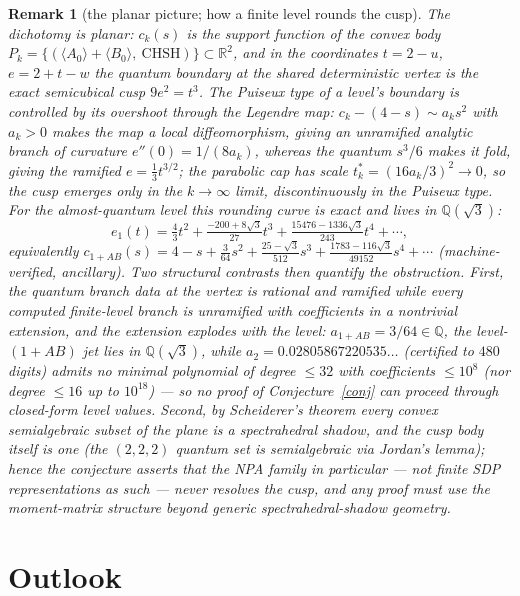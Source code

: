 \documentclass[11pt]{article}
\newtheorem{remark}[theorem]{Remark}
\begin{document}
\begin{remark}[the planar picture; how a finite level rounds the cusp]
The dichotomy is planar: $c_k(s)$ is the support function of the convex body
$P_k=\{(\langle A_0\rangle{+}\langle B_0\rangle,\ \mathrm{CHSH})\}\subset\mathbb R^2$,
and in the coordinates $t=2-u$, $e=2+t-w$ the quantum boundary at the shared
deterministic vertex is the exact semicubical cusp $9e^2=t^3$. The Puiseux type
of a level's boundary is controlled by its overshoot through the Legendre map:
$c_k-(4-s)\sim a_k s^2$ with $a_k>0$ makes the map a local diffeomorphism,
giving an \emph{unramified} analytic branch of curvature $e''(0)=1/(8a_k)$,
whereas the quantum $s^3/6$ makes it fold, giving the ramified $e=\tfrac13
t^{3/2}$; the parabolic cap has scale $t^*_k=(16a_k/3)^2\to0$, so the cusp
emerges only in the $k\to\infty$ limit, discontinuously in the Puiseux type.
For the almost-quantum level this rounding curve is exact and lives in
$\mathbb Q(\sqrt3)$:
\[
 e_1(t)=\tfrac43t^2+\tfrac{-200+8\sqrt3}{27}t^3+\tfrac{15476-1336\sqrt3}{243}t^4+\cdots,
\]
equivalently $c_{1+AB}(s)=4-s+\tfrac3{64}s^2+\tfrac{25-\sqrt3}{512}s^3
+\tfrac{1783-116\sqrt3}{49152}s^4+\cdots$ (machine-verified, ancillary). Two
structural contrasts then quantify the obstruction. First, the quantum branch
data at the vertex is rational and ramified while every computed finite-level
branch is unramified with coefficients in a nontrivial extension, and the
extension \emph{explodes} with the level: $a_{1+AB}=3/64\in\mathbb Q$, the
level-$(1{+}AB)$ jet lies in $\mathbb Q(\sqrt3)$, while $a_2=0.02805867220535\ldots$
(certified to $480$ digits) admits \emph{no} minimal polynomial of degree
$\le32$ with coefficients $\le10^8$ (nor degree $\le16$ up to $10^{18}$) --- so
no proof of Conjecture~\ref{conj} can proceed through closed-form level values.
Second, by Scheiderer's theorem every convex semialgebraic subset of the plane
is a spectrahedral shadow, and the cusp body itself is one (the $(2,2,2)$
quantum set is semialgebraic via Jordan's lemma); hence the conjecture asserts
that the NPA family in particular --- not finite SDP representations as such ---
never resolves the cusp, and any proof must use the moment-matrix structure
beyond generic spectrahedral-shadow geometry.
\end{remark}

\section{Outlook}
\end{document}
